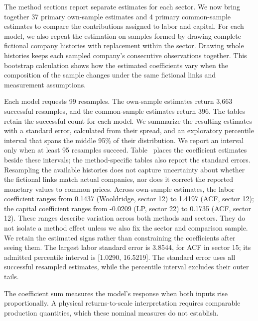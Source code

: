 The method sections report separate estimates for each sector. We now bring together 37 primary own-sample estimates and 4 primary common-sample estimates to compare the contributions assigned to labor and capital. For each model, we also repeat the estimation on samples formed by drawing complete fictional company histories with replacement within the sector. Drawing whole histories keeps each sampled company's consecutive observations together. This bootstrap calculation shows how the estimated coefficients vary when the composition of the sample changes under the same fictional links and measurement assumptions.

Each model requests 99 resamples. The own-sample estimates return 3,663 successful resamples, and the common-sample estimates return 396. The tables retain the successful count for each model. We summarize the resulting estimates with a standard error, calculated from their spread, and an exploratory percentile interval that spans the middle 95\% of their distribution. We report an interval only when at least 95 resamples succeed. Table~ places the coefficient estimates beside these intervals; the method-specific tables also report the standard errors. Resampling the available histories does not capture uncertainty about whether the fictional links match actual companies, nor does it correct the reported monetary values to common prices.
Across own-sample estimates, the labor coefficient ranges from 0.1437 (Wooldridge, sector 12) to 1.4197 (ACF, sector 12); the capital coefficient ranges from -0.0209 (LP, sector 22) to 0.1735 (ACF, sector 12). These ranges describe variation across both methods and sectors. They do not isolate a method effect unless we also fix the sector and comparison sample. We retain the estimated signs rather than constraining the coefficients after seeing them. The largest labor standard error is 3.8544, for ACF in sector 15; its admitted percentile interval is [1.0290, 16.5219]. The standard error uses all successful resampled estimates, while the percentile interval excludes their outer tails.

The coefficient sum measures the model's response when both inputs rise proportionally. A physical returns-to-scale interpretation requires comparable production quantities, which these nominal measures do not establish.

